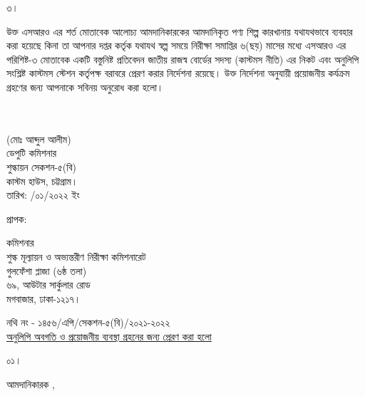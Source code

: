 \documentclass[12pt]{article}
\newcommand{\fileno}{নথি নং - ১৪৫৬/এপি/সেকশন-৫(বি)/২০২১-২০২২}
\newcommand{\impn}{\jsml}
\newcommand{\impadd}{\jsmla}
\newcommand{\rodt}{তারিখ: \hspace{2.0em}/০১/২০২২ ইং}
\begin{document}
\begin{minipage}[t]{.07\linewidth}
৩।
\end{minipage}
\begin{minipage}[t]{.93\linewidth}
উক্ত এসআরও এর শর্ত মোতাবেক
আলোচ্য আমদানিকারকের আমদানিকৃত পণ্য
শিল্প কারখানায় যথাযথভাবে ব্যবহার করা হয়েছে
কিনা তা আপনার দপ্তর কর্তৃক
যথাযথ স্বল্প সময়ে
নিরীক্ষা সমাপ্তির ৬(ছয়) মাসের মধ্যে এসআরও
এর পরিশিষ্ট-৩ মোতাবেক একটি বস্তুনিষ্ট
প্রতিবেদন জাতীয় রাজস্ব বোর্ডের সদস্য
(কাস্টমস নীতি) এর নিকট এবং অনুলিপি সংশ্লিষ্ট
কাস্টমস স্টেশন কর্তৃপক্ষ বরাবরে প্রেরণ করার
নির্দেশনা রয়েছে। উক্ত নির্দেশনা
অনুযায়ী প্রয়োজনীয় কর্যক্রম গ্রহণের জন্য
আপনাকে সবিনয় অনুরোধ করা হলো।
\\
\\
\\
\end{minipage}
\begin{minipage}[t]{0.60\linewidth}
\hspace{1em}
\end{minipage}
\begin{minipage}[t]{0.40\linewidth}
\begin{center}
(মোঃ আব্দুল আলীম)
\\
ডেপুটি কমিশনার
\\
শুল্কায়ন সেকশন-৫(বি)
\\
কাস্টম হাউস, চট্টগ্রাম।
\\
\footnotesize{{\rodt}}
\vspace*{5MM}
\end{center}
\end{minipage}
\begin{minipage}[t]{.07\linewidth}
প্রাপক:
\end{minipage}
\begin{minipage}[t]{.93\linewidth}
কমিশনার
\\
শুল্ক মূল্যায়ন ও অভ্যন্তরীণ নিরীক্ষা কমিশনারেট
\\
গুলফেঁশা প্লাজা (৬ষ্ঠ তলা)
\\
৬৯, আউটার সার্কুলার রোড
\\
মগবাজার, ঢাকা-১২১৭।
\\
\end{minipage}
\footnotesize{{\fileno}}
\\
\underline{\footnotesize{অনুলিপি অবগতি ও প্রয়োজনীয় ব্যবস্থা গ্রহনের জন্য প্রেরণ করা হলো}}
\\
\begin{minipage}[t]{0.06\linewidth}
\footnotesize{০১।}
\end{minipage}
\begin{minipage}[t]{0.94\linewidth}
\footnotesize{
আমদানিকারক {\impn}, {\impadd}
}
\end{minipage}
\end{document}
